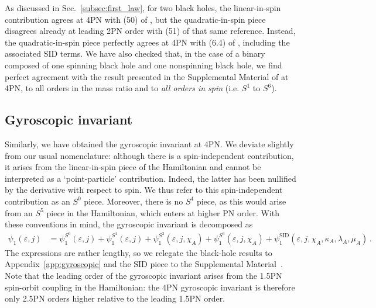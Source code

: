 \documentclass[prd,superscriptaddress,preprintnumbers,tightenlines,nofootinbib, eqsecnum]{revtex4-2}
\begin{document}
As discussed in Sec.~\ref{subsec:first_law}, for two black holes, the linear-in-spin contribution agrees at 4PN with (50) of \cite{Bini:2019lcd}, but the quadratic-in-spin piece disagrees already at leading 2PN order with (51) of that same reference. Instead, the quadratic-in-spin piece perfectly agrees at 4PN with (6.4) of \cite{Bini:2020zqy}, including the associated SID terms. We have also checked that, in the case of a binary composed of one spinning black hole and one nonspinning black hole, we find perfect agreement with the result presented in the Supplemental Material of \cite{Bautista:2024agp} at 4PN, to all orders in the mass ratio and to \textit{all orders in spin} (i.e. $S^1$ to $S^6$). 
 

\subsection{Gyroscopic invariant}
\label{subsec:gyroscopic}


Similarly, we have obtained the gyroscopic invariant at 4PN. We deviate slightly from our usual nomenclature: although there is a spin-independent contribution, it arises from the linear-in-spin piece of the Hamiltonian and cannot be interpreted as a `point-particle' contribution. Indeed, the latter has been nullified by the derivative with respect to spin. We thus refer to this spin-independent contribution as an $S^0$ piece. Moreover, there is no $S^4$ piece, as this would arise from an $S^5$ piece in the Hamiltonian, which enters at higher PN order. With these conventions in mind, the gyroscopic invariant is decomposed as 
\begin{align}
    \psi_1(\varepsilon,j)&= \psi_1^{S^0}(\varepsilon,j)+\psi_1^{S^1}(\varepsilon,j)+\psi_1^{S^2}(\varepsilon,j,\chi_A)+\psi_1^{S^3}(\varepsilon,j,\chi_A)+\psi_1^\text{SID}(\varepsilon,j,\chi_A,\kappa_A,\lambda_A,\mu_A) \,.
\end{align}
The expressions are rather lengthy, so we relegate the black-hole results to Appendix~\ref{app:gyroscopic} and the SID piece to the Supplemental Material~\cite{Supplemental}. Note that the leading order of the gyroscopic invariant arises from the 1.5PN spin-orbit coupling in the Hamiltonian: the 4PN gyroscopic invariant is therefore only 2.5PN orders higher relative to the leading 1.5PN order.
\end{document}
